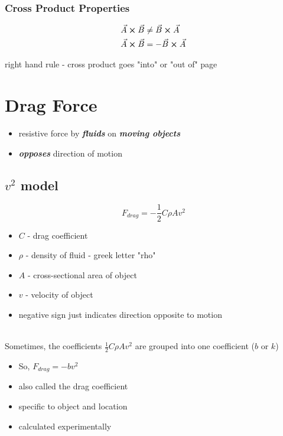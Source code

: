 \documentclass[titlepage]{article}
\begin{document}
\subsubsection{Cross Product Properties}

\begin{align*}
     & \vec{A} \cross \vec{B} \neq \vec{B} \cross \vec{A} \\
     & \vec{A} \cross \vec{B} = - \vec{B} \cross \vec{A}
\end{align*}

right hand rule - cross product goes "into" or "out of" page

\section{Drag Force}
\begin{itemize}
    \item resistive force by \textbf{\emph{fluids}} on \textbf{\emph{moving objects}}
    \item \textbf{\emph{opposes}} direction of motion
\end{itemize}

\subsection{$v^2$ model}
\[ F_{drag} = - \frac{1}{2} C \rho A v^2 \]

\begin{itemize}
    \item $C$ - drag coefficient
    \item $\rho$ - density of fluid - greek letter "rho"
    \item $A$ - cross-sectional area of object
    \item $v$ - velocity of object
    \item negative sign just indicates direction opposite to motion
\end{itemize}
\ \\
Sometimes, the coefficients $\frac{1}{2}C \rho A v^2$ are grouped into one coefficient ($b$ or $k$)

\begin{itemize}
    \item So, $F_{drag} = -bv^2$
    \item also called the drag coefficient
    \item specific to object and location
    \item calculated experimentally
\end{itemize}
\end{document}
